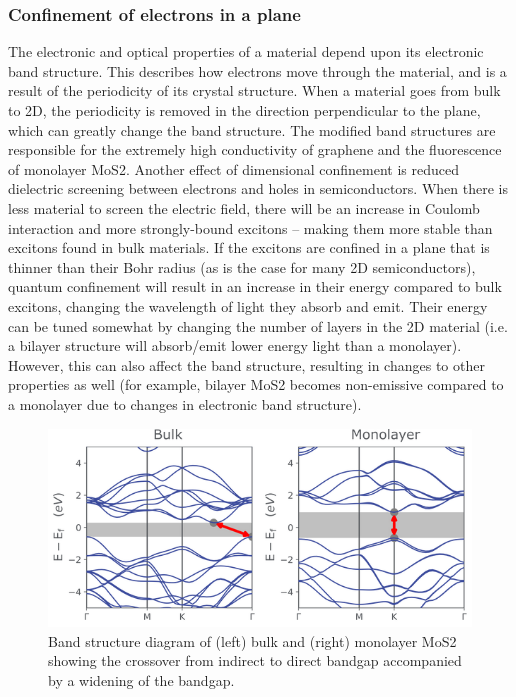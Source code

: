 \documentclass[12pt,a4paper]{report}
\begin{document}
\begin{itemize}
\subsubsection{Confinement of electrons in a plane  }
The electronic and optical properties of a material depend upon its electronic band structure. This describes how electrons move through the material, and is a result of the periodicity of its crystal structure. When a material goes from bulk to 2D, the periodicity is removed in the direction perpendicular to the plane, which can greatly change the band structure. The modified band structures are responsible for the extremely high conductivity of graphene and the fluorescence of monolayer MoS2.
Another effect of dimensional confinement is reduced dielectric screening between electrons and holes in semiconductors. When there is less material to screen the electric field, there will be an increase in Coulomb interaction and more strongly-bound excitons – making them more stable than excitons found in bulk materials. If the excitons are confined in a plane that is thinner than their Bohr radius (as is the case for many 2D semiconductors), quantum confinement will result in an increase in their energy compared to bulk excitons, changing the wavelength of light they absorb and emit.
Their energy can be tuned somewhat by changing the number of layers in the 2D material (i.e. a bilayer structure will absorb/emit lower energy light than a monolayer). However, this can also affect the band structure, resulting in changes to other properties as well (for example, bilayer MoS2 becomes non-emissive compared to a monolayer due to changes in electronic band structure).
\begin{figure}
  \centering
  \includegraphics[scale=2]{2.2.1.png}
  \caption{Band structure diagram of (left) bulk and (right) monolayer MoS2 showing the crossover from indirect to direct bandgap accompanied by a widening of the bandgap.}
  \label{bandgap}
  \end{figure}


\end{itemize}
\end{document}
